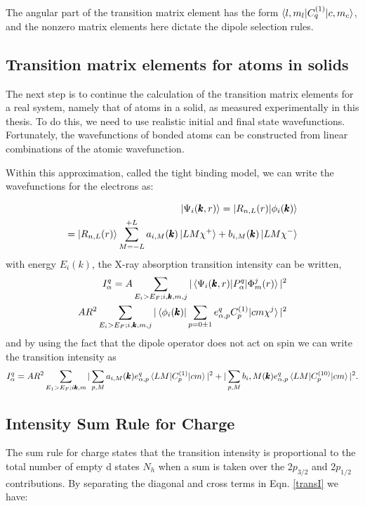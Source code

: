 The angular part of the transition matrix element has the form $\braket{l,m_l|C_q^{(1)}|c,m_c}$, and the nonzero matrix elements here dictate the dipole selection rules.

\subsection{Transition matrix elements for atoms in solids}

The next step is to continue the calculation of the transition matrix elements for a real system, namely that of atoms in a solid, as measured experimentally in this thesis. To do this, we need to use realistic initial and final state wavefunctions. Fortunately, the wavefunctions of bonded atoms can be constructed from linear combinations of the atomic  wavefunction.

Within this approximation, called the tight binding model, we can write the wavefunctions for the electrons as:

\begin{eqnarray}
\ket{\Psi_i(\pmb{k},r)}=\ket{R_{n,L}(r)|\phi_i(\pmb{k})} \\
= \ket{R_{n,L}(r)}\sum^{+L}_{M=-L}a_{i,M}(\pmb{k})\ket{LM\chi^+}+b_{i,M}(\pmb{k})\ket{LM\chi^-}
\end{eqnarray}
with energy $E_i(k)$, the X-ray absorption transition intensity can be written,
\begin{eqnarray}
I_\alpha^q = A\sum_{E_i>E_F; i ,\pmb{k}, m, j} |\braket{\Psi_i(\pmb{k},r)|P_\alpha^q|\Phi_m^j(r)}|^2 \\
A R^2 \sum_{E_i>E_F;i,\pmb{k},m,j}|\braket{\phi_i(\pmb{k})|\sum_{p=0\pm 1}e^q_{\alpha,p}C_p^{(1)}|cm\chi^j}|^2
\end{eqnarray}
and by using the fact that the dipole operator does not act on spin we can write the transition intensity as
\begin{eqnarray}
I_\alpha^q=AR^2\sum_{E_1>E_F; i\pmb{k},m}|\sum_{p,M}a_{i,M}(\pmb{k})e_{\alpha,p}^q\braket{LM|C_p^{(1)}|cm}|^2+|\sum_{p,M}b_i,M(\pmb{k})e^q_{\alpha,p}\braket{LM|C_p^{(10)}|cm}|^2.
\label{transI}
\end{eqnarray}

\subsection{Intensity Sum Rule for Charge}

The sum rule for charge states that the transition intensity is proportional to the total number of empty d states $N_h$ when a sum is taken over the 2$p_{3/2}$ and 2$p_{1/2}$ contributions. By separating the diagonal and cross terms in Eqn. \ref{transI} we have:

